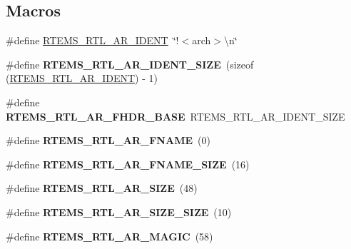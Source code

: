 \subsection*{Macros}
\begin{DoxyCompactItemize}
\item 
\#define \mbox{\hyperlink{rtl-archive_8c_a5ef2fee55deb8475bec01267e205ca2b}{R\+T\+E\+M\+S\+\_\+\+R\+T\+L\+\_\+\+A\+R\+\_\+\+I\+D\+E\+NT}}~\char`\"{}!$<$arch$>$\textbackslash{}n\char`\"{}
\item 
\mbox{\label{rtl-archive_8c_a742efdd96ae51d369a9f8325b481c109}} 
\#define {\bfseries R\+T\+E\+M\+S\+\_\+\+R\+T\+L\+\_\+\+A\+R\+\_\+\+I\+D\+E\+N\+T\+\_\+\+S\+I\+ZE}~(sizeof (\mbox{\hyperlink{rtl-archive_8c_a5ef2fee55deb8475bec01267e205ca2b}{R\+T\+E\+M\+S\+\_\+\+R\+T\+L\+\_\+\+A\+R\+\_\+\+I\+D\+E\+NT}}) -\/ 1)
\item 
\mbox{\label{rtl-archive_8c_af457aa770a55d2fefac50ba5d9583329}} 
\#define {\bfseries R\+T\+E\+M\+S\+\_\+\+R\+T\+L\+\_\+\+A\+R\+\_\+\+F\+H\+D\+R\+\_\+\+B\+A\+SE}~R\+T\+E\+M\+S\+\_\+\+R\+T\+L\+\_\+\+A\+R\+\_\+\+I\+D\+E\+N\+T\+\_\+\+S\+I\+ZE
\item 
\mbox{\label{rtl-archive_8c_a46d18cf1ca2d6abd918671017bf830cd}} 
\#define {\bfseries R\+T\+E\+M\+S\+\_\+\+R\+T\+L\+\_\+\+A\+R\+\_\+\+F\+N\+A\+ME}~(0)
\item 
\mbox{\label{rtl-archive_8c_a83d88c400e775010c1ca51e37e5bb3d2}} 
\#define {\bfseries R\+T\+E\+M\+S\+\_\+\+R\+T\+L\+\_\+\+A\+R\+\_\+\+F\+N\+A\+M\+E\+\_\+\+S\+I\+ZE}~(16)
\item 
\mbox{\label{rtl-archive_8c_a8707de37f14218eab5754cad321fa282}} 
\#define {\bfseries R\+T\+E\+M\+S\+\_\+\+R\+T\+L\+\_\+\+A\+R\+\_\+\+S\+I\+ZE}~(48)
\item 
\mbox{\label{rtl-archive_8c_afcefff3fcdcdf738e52edab998ec724a}} 
\#define {\bfseries R\+T\+E\+M\+S\+\_\+\+R\+T\+L\+\_\+\+A\+R\+\_\+\+S\+I\+Z\+E\+\_\+\+S\+I\+ZE}~(10)
\item 
\mbox{\label{rtl-archive_8c_a9c93b2d6f4bbabe66ca648217cc8c83e}} 
\#define {\bfseries R\+T\+E\+M\+S\+\_\+\+R\+T\+L\+\_\+\+A\+R\+\_\+\+M\+A\+G\+IC}~(58)
\item 

\end{DoxyCompactItemize}
